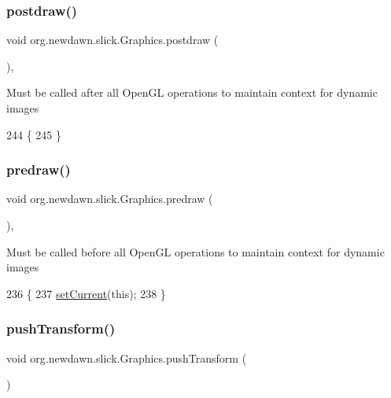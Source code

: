 \subsubsection{\texorpdfstring{postdraw()}{postdraw()}}
{\footnotesize\ttfamily void org.\+newdawn.\+slick.\+Graphics.\+postdraw (\begin{DoxyParamCaption}{ }\end{DoxyParamCaption})\hspace{0.3cm}{\ttfamily [inline]}, {\ttfamily [private]}}

Must be called after all Open\+GL operations to maintain context for dynamic images 
\begin{DoxyCode}
244                             \{
245     \}
\end{DoxyCode}
\mbox{\label{classorg_1_1newdawn_1_1slick_1_1_graphics_a7b4c203181e3b6302d51ed9b24596b8d}} 
\subsubsection{\texorpdfstring{predraw()}{predraw()}}
{\footnotesize\ttfamily void org.\+newdawn.\+slick.\+Graphics.\+predraw (\begin{DoxyParamCaption}{ }\end{DoxyParamCaption})\hspace{0.3cm}{\ttfamily [inline]}, {\ttfamily [private]}}

Must be called before all Open\+GL operations to maintain context for dynamic images 
\begin{DoxyCode}
236                            \{
237         \mbox{\hyperlink{classorg_1_1newdawn_1_1slick_1_1_graphics_ae48fbeb2d9125d9de9ec19c8d71c5df5}{setCurrent}}(\textcolor{keyword}{this});
238     \}
\end{DoxyCode}
\mbox{\label{classorg_1_1newdawn_1_1slick_1_1_graphics_aabec073ba0ee1e86cccddc175f2ebbb5}} 
\subsubsection{\texorpdfstring{push\+Transform()}{pushTransform()}}
{\footnotesize\ttfamily void org.\+newdawn.\+slick.\+Graphics.\+push\+Transform (\begin{DoxyParamCaption}{ }\end{DoxyParamCaption})\hspace{0.3cm}{\ttfamily [inline]}}

